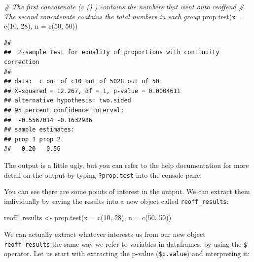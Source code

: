 \documentclass[
]{book}
\newenvironment{Shaded}{\begin{snugshade}}{\end{snugshade}}
\newcommand{\AttributeTok}[1]{\textcolor[rgb]{0.77,0.63,0.00}{#1}}
\newcommand{\CommentTok}[1]{\textcolor[rgb]{0.56,0.35,0.01}{\textit{#1}}}
\newcommand{\DecValTok}[1]{\textcolor[rgb]{0.00,0.00,0.81}{#1}}
\newcommand{\FunctionTok}[1]{\textcolor[rgb]{0.00,0.00,0.00}{#1}}
\newcommand{\NormalTok}[1]{#1}
\newcommand{\OtherTok}[1]{\textcolor[rgb]{0.56,0.35,0.01}{#1}}
\newcommand{\SpecialCharTok}[1]{\textcolor[rgb]{0.00,0.00,0.00}{#1}}
\begin{document}
\begin{Shaded}
\begin{Highlighting}[]
\CommentTok{\# The first concatenate (c () ) contains the numbers that went onto reoffend}
\CommentTok{\# The second concatenate contains the total numbers in each group}
\FunctionTok{prop.test}\NormalTok{(}\AttributeTok{x =} \FunctionTok{c}\NormalTok{(}\DecValTok{10}\NormalTok{, }\DecValTok{28}\NormalTok{), }\AttributeTok{n =} \FunctionTok{c}\NormalTok{(}\DecValTok{50}\NormalTok{, }\DecValTok{50}\NormalTok{))}
\end{Highlighting}
\end{Shaded}

\begin{verbatim}
## 
##  2-sample test for equality of proportions with continuity correction
## 
## data:  c out of c10 out of 5028 out of 50
## X-squared = 12.267, df = 1, p-value = 0.0004611
## alternative hypothesis: two.sided
## 95 percent confidence interval:
##  -0.5567014 -0.1632986
## sample estimates:
## prop 1 prop 2 
##   0.20   0.56
\end{verbatim}

The output is a little ugly, but you can refer to the help documentation for more detail on the output by typing \texttt{?prop.test} into the console pane.

You can see there are some points of interest in the output. We can extract them individually by saving the results into a new object called \texttt{reoff\_results}:

\begin{Shaded}
\begin{Highlighting}[]
\NormalTok{reoff\_results }\OtherTok{\textless{}{-}} \FunctionTok{prop.test}\NormalTok{(}\AttributeTok{x =} \FunctionTok{c}\NormalTok{(}\DecValTok{10}\NormalTok{, }\DecValTok{28}\NormalTok{), }\AttributeTok{n =} \FunctionTok{c}\NormalTok{(}\DecValTok{50}\NormalTok{, }\DecValTok{50}\NormalTok{))}
\end{Highlighting}
\end{Shaded}

We can actually extract whatever interests us from our new object \texttt{reoff\_results} the same way we refer to variables in dataframes, by using the \texttt{\$} operator. Let us start with extracting the p-value (\texttt{\$p.value}) and interpreting it:

\begin{Shaded}
\end{Shaded}
\end{document}
